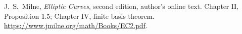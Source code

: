 J.~S.~Milne, \emph{Elliptic Curves}, second edition,
author's online text.
Chapter II, Proposition 1.5; Chapter IV, finite-basis theorem.
\url{https://www.jmilne.org/math/Books/EC2.pdf}.

